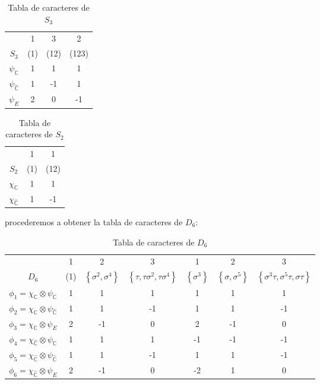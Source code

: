 \documentclass[12pt]{book}
\theoremstyle{definition}
\newcounter{in}
\begin{document}
\begin{table}[H]
  \centering
  \begin{tabular}{ c| c c c}
      & 1 & 3 & 2 \\
      $S_{3}$ & (1) & (12) & (123) \\
      \hline
      $\psi_{\mathbb{C}}$ & 1 & 1 & 1 \\
      $\psi_{\mathbb{\hat C}}$ & 1 & -1 & 1 \\
      $\psi_{E}$ & 2 & 0 & -1 
    \end{tabular}
    
  \caption{Tabla de caracteres de $S_{3}$}
  \label{tabla-car-S3}
\end{table}
\begin{table}[H]
  \centering
  \begin{tabular}{ c| c c}
      & 1 & 1 \\
      $S_{2}$ & (1) & (12) \\
      \hline
      $\chi_{\mathbb{C}}$ & 1 & 1 \\
      $\chi_{\mathbb{\hat C}}$ & 1 & -1
    \end{tabular}
    
  \caption{Tabla de caracteres de $S_{2}$}
  \label{tabla-car-S2}
\end{table}
procederemos a obtener la tabla de caracteres de $D_{6}$:
\begin{table}[H]
  \centering
  \begin{tabular}{ c| c c c c c c}
      & 1 & 2 & 3 & 1 & 2 & 3 \\
      $D_{6}$ & (1) & $\left \{ \sigma^{2}, \sigma^{4} \right \}$ & $\left \{ \tau, \tau \sigma^{2}, \tau \sigma^{4} \right \}$ & $\left \{ \sigma^{3} \right \}$ & $\left \{ \sigma, \sigma^{5} \right \}$ & $\left \{ \sigma^{3} \tau, \sigma^{5} \tau, \sigma \tau \right \}$\\
      \hline
      $\phi_{1} = \chi_{\mathbb{C}} \otimes \psi_{\mathbb{C}}$ & 1 & 1 & 1 & 1 & 1 & 1\\
      $\phi_{2} = \chi_{\mathbb{C}} \otimes \psi_{\mathbb{\hat C}}$ & 1 & 1 & -1 & 1 & 1 & -1\\
      $\phi_{3} = \chi_{\mathbb{C}} \otimes \psi_{E}$ & 2 & -1 & 0 & 2 & -1 & 0\\
      $\phi_{4} = \chi_{\mathbb{\hat C}} \otimes \psi_{\mathbb{C}}$ & 1 & 1 & 1 & -1 & -1 & -1\\
      $\phi_{5} = \chi_{\mathbb{\hat C}} \otimes \psi_{\mathbb{\hat C}}$ & 1 & 1 & -1 & 1 & 1 & -1\\
      $\phi_{6} = \chi_{\mathbb{\hat C}} \otimes \psi_{E}$ & 2 & -1 & 0 & -2 & 1 & 0
    \end{tabular}
  \caption{Tabla de caracteres de $D_{6}$}
  \label{tabla-car-S3}
\end{table}
\end{document}
